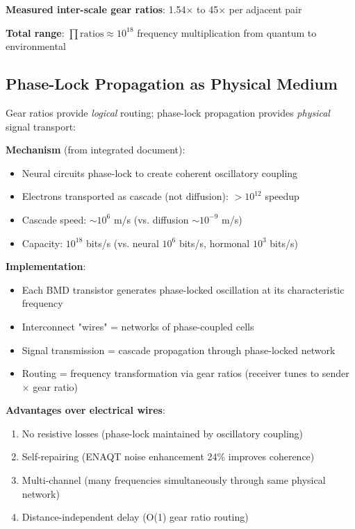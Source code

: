 \documentclass[11pt,a4paper]{article}
\begin{document}
\textbf{Measured inter-scale gear ratios}: 1.54× to 45× per adjacent pair

\textbf{Total range}: $\prod \text{ratios} \approx 10^{18}$ frequency multiplication from quantum to environmental

\subsection{Phase-Lock Propagation as Physical Medium}

Gear ratios provide \textit{logical} routing; phase-lock propagation provides \textit{physical} signal transport:

\textbf{Mechanism} (from integrated document):
\begin{itemize}
\item Neural circuits phase-lock to create coherent oscillatory coupling
\item Electrons transported as cascade (not diffusion): $>10^{12}$ speedup
\item Cascade speed: $\sim 10^6$ m/s (vs. diffusion $\sim 10^{-9}$ m/s)
\item Capacity: $10^{18}$ bits/s (vs. neural $10^6$ bits/s, hormonal $10^3$ bits/s)
\end{itemize}

\textbf{Implementation}:
\begin{itemize}
\item Each BMD transistor generates phase-locked oscillation at its characteristic frequency
\item Interconnect "wires" = networks of phase-coupled cells
\item Signal transmission = cascade propagation through phase-locked network
\item Routing = frequency transformation via gear ratios (receiver tunes to sender × gear ratio)
\end{itemize}

\textbf{Advantages over electrical wires}:
\begin{enumerate}
\item No resistive losses (phase-lock maintained by oscillatory coupling)
\item Self-repairing (ENAQT noise enhancement 24\% improves coherence)
\item Multi-channel (many frequencies simultaneously through same physical network)
\item Distance-independent delay (O(1) gear ratio routing)
\end{enumerate}
\end{document}
